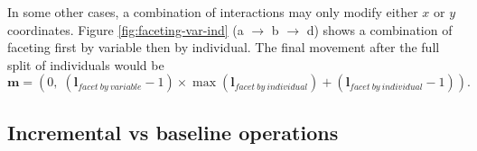 \documentclass[12pt]{article}
\providecommand{\tabularnewline}{\\}
\begin{document}
In some other cases, a combination of interactions may
only modify either $x$ or $y$ coordinates. Figure
\ref{fig:faceting-var-ind} (a $\rightarrow$ b $\rightarrow$ d)
shows a combination of faceting first by variable then
by individual. The final movement after the full split
of individuals would be
\[
\mathbf{m} = (0, \; (\mathbf{l}{}_{facet~by~variable}-1)\times \max(\mathbf{l}{}_{facet~by~individual})+(\mathbf{l}{}_{facet~by~individual}-1)).
\]
%

\subsection{Incremental vs baseline operations\label{sub:Two-procedures}}
\end{document}
